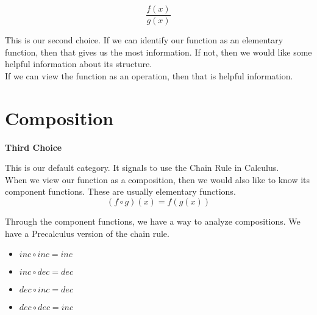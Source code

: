 \documentclass{ximera}
\begin{document}
\[
\frac{f(x)}{g(x)}
\]





This is our second choice.  If we can identify our function as an elementary function, then that gives us the most information. If not, then we would like some helpful information about its structure. \\



If we can view the function as an operation, then that is helpful information.\\







































\section{Composition}


\textbf{\textcolor{purple!85!blue}{Third Choice}} 

This is our default category.  It signals to use the Chain Rule in Calculus. \\


When we view our function as a composition, then we would also like to know its component functions. These are usually elementary functions. \\



\[
(f \circ g)(x) = f(g(x))
\]



Through the component functions, we have a way to analyze compositions.  We have a Precalculus version of the chain rule.


\begin{itemize}
\item  $inc \circ inc = inc$
\item  $inc \circ dec = dec$
\item  $dec \circ inc = dec$
\item  $dec \circ dec = inc$
\end{itemize}
\end{document}
